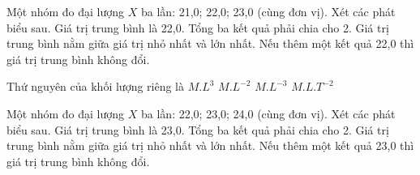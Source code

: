 \begin{ex}
Một nhóm đo đại lượng $X$ ba lần: 21,0; 22,0; 23,0 (cùng đơn vị). Xét các phát biểu sau.
\choiceTF
{\True Giá trị trung bình là 22,0.}
{Tổng ba kết quả phải chia cho 2.}
{\True Giá trị trung bình nằm giữa giá trị nhỏ nhất và lớn nhất.}
{\True Nếu thêm một kết quả 22,0 thì giá trị trung bình không đổi.}
\end{ex}


\begin{ex}
Thứ nguyên của khối lượng riêng là
\choice
{$M.L^3$}
{$M.L^{-2}$}
{\True $M.L^{-3}$}
{$M.L.T^{-2}$}
\end{ex}

\begin{ex}
Một nhóm đo đại lượng $X$ ba lần: 22,0; 23,0; 24,0 (cùng đơn vị). Xét các phát biểu sau.
\choiceTF
{\True Giá trị trung bình là 23,0.}
{Tổng ba kết quả phải chia cho 2.}
{\True Giá trị trung bình nằm giữa giá trị nhỏ nhất và lớn nhất.}
{\True Nếu thêm một kết quả 23,0 thì giá trị trung bình không đổi.}
\end{ex}

